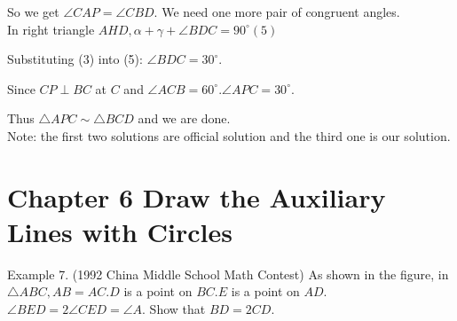 \documentclass[10pt]{article}
\begin{document}
So we get \(\angle C A P=\angle C B D\). We need one more pair of congruent angles.\\
In right triangle \(A H D, \alpha+\gamma+\angle B D C=90^{\circ}(5)\)

Substituting (3) into (5): \(\angle B D C=30^{\circ}\).

Since \(C P \perp B C\) at \(C\) and \(\angle A C B=60^{\circ} . \angle A P C=30^{\circ}\).

Thus \(\triangle A P C \sim \triangle B C D\) and we are done.\\
Note: the first two solutions are official solution and the third one is our solution.

\section*{Chapter 6 Draw the Auxiliary Lines with Circles}
Example 7. (1992 China Middle School Math Contest) As shown in the figure, in \(\triangle A B C, A B=A C . D\) is a point on \(B C . E\) is a point on \(A D\). \(\angle B E D=2 \angle C E D=\angle A\). Show that \(B D=2 C D\).
\end{document}
